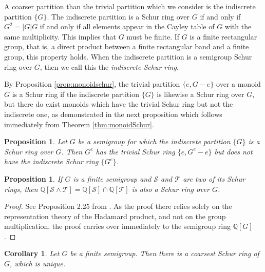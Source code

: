 \documentclass{article}
\theoremstyle{plain}
\newtheorem{Cor}[Thm]{Corollary}
\newtheorem{Prop}[Thm]{Proposition}
\theoremstyle{definition}
\renewcommand{\S}{\mathcal{S}}
\newcommand{\T}{\mathcal{T}}
\newcommand{\Q}{\mathbb{Q}}
\DeclareMathOperator*{\Span}{Span}
\begin{document}
A coarser partition than the trivial partition which we consider is the indiscrete partition $\{G\}$. The indiscrete partition is a Schur ring over $G$ if and only if $G^2 = |G|G$ if and only if all elements appear in the Cayley table of $G$ with the same multiplicity. This implies that $G$ must be finite. If $G$ is a finite rectangular group, that is, a direct product between a finite rectangular band and a finite group, this property holds. When the indiscrete partition is a semigroup Schur ring over $G$, then we call this the \emph{indiscrete Schur ring}. 

By Proposition \ref{prop:monoidschur}, the trivial partition $\{e, G-e\}$ over a monoid $G$ is a Schur ring if the indiscrete partition $\{G\}$ is likewise a Schur ring over $G$, but there do exist monoids which have the trivial Schur ring but not the indiscrete one, as demonstrated in the next proposition which follows immediately from Theorem \ref{thm:monoidSchur}.

\begin{Prop} Let $G$ be a semigroup for which the indiscrete partition $\{G\}$ is a Schur ring over $G$. Then $G^e$ has the trivial Schur ring $\{e,G^e-e\}$ but does not have the indiscrete Schur ring $\{G^e\}$.
\end{Prop}

\begin{Prop} If $G$ is a finite semigroup and $\S$ and $\T$ are two of its Schur rings, then $\Q[\S\wedge \T] = \Q[\S]\cap \Q[\T]$ is also a Schur ring over $G$.
\end{Prop}
\begin{proof} See Proposition 2.25 from \cite{MePhD}. As the proof there relies solely on the representation theory of the Hadamard product, and not on the group multiplication, the proof carries over immediately to the semigroup ring $\Q[G]$.
\end{proof}

\begin{Cor}\label{coarsest}
Let $G$ be a finite semigroup. Then there is a coarsest Schur ring of $G$, which is unique.
\end{Cor}
\end{document}
